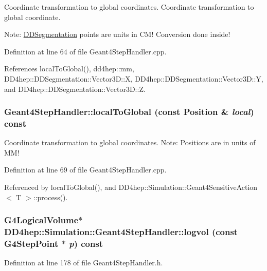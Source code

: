 Coordinate transformation to global coordinates. Coordinate transformation to global coordinate.

Note: \hyperlink{namespace_d_d4hep_1_1_d_d_segmentation}{DDSegmentation} points are units in CM! Conversion done inside! 

Definition at line 64 of file Geant4StepHandler.cpp.

References localToGlobal(), dd4hep::mm, DD4hep::DDSegmentation::Vector3D::X, DD4hep::DDSegmentation::Vector3D::Y, and DD4hep::DDSegmentation::Vector3D::Z.\hypertarget{class_d_d4hep_1_1_simulation_1_1_geant4_step_handler_a4287f0adeca49bd4a4e6c5bc1054e1a1}{
\subsubsection[{localToGlobal}]{ Geant4StepHandler::localToGlobal (const {\bf Position} \& {\em local}) const}}
\label{class_d_d4hep_1_1_simulation_1_1_geant4_step_handler_a4287f0adeca49bd4a4e6c5bc1054e1a1}


Coordinate transformation to global coordinates. Note: Positions are in units of MM! 

Definition at line 69 of file Geant4StepHandler.cpp.

Referenced by localToGlobal(), and DD4hep::Simulation::Geant4SensitiveAction$<$ T $>$::process().\hypertarget{class_d_d4hep_1_1_simulation_1_1_geant4_step_handler_a60c5a97f61fc6aa52224c474632aed47}{
\subsubsection[{logvol}]{\setlength{\rightskip}{0pt plus 5cm}G4LogicalVolume$\ast$ DD4hep::Simulation::Geant4StepHandler::logvol (const G4StepPoint $\ast$ {\em p}) const}}
\label{class_d_d4hep_1_1_simulation_1_1_geant4_step_handler_a60c5a97f61fc6aa52224c474632aed47}


Definition at line 178 of file Geant4StepHandler.h.

